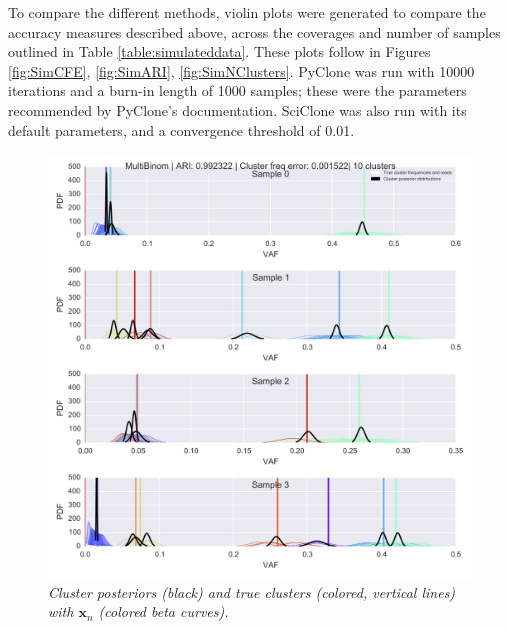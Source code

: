\documentclass[11pt]{article}
\newcommand{\bx}{\ensuremath{\mathbf{x}}}
\begin{document}
To compare the different methods, violin plots were generated to compare the accuracy measures described above, across the coverages and number of samples outlined in Table \ref{table:simulateddata}. These plots follow in Figures \ref{fig:SimCFE}, \ref{fig:SimARI}, \ref{fig:SimNClusters}. PyClone was run with 10000 iterations and a burn-in length of 1000 samples; these were the parameters recommended by PyClone's documentation. SciClone was also run with its default parameters, and a convergence threshold of 0.01.

\begin{figure}[H]
\centerline{\includegraphics{example_indiv_plot.png}}
\caption{\emph{Cluster posteriors (black) and true clusters (colored, vertical lines) with $\bx_n$ (colored beta curves).}}
\label{fig:indivplot}
\end{figure}
\end{document}
